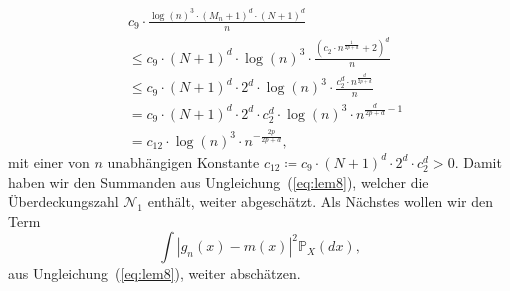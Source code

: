 {\begin{equation}
\begin{split}
& c_9 \cdot \frac{\log(n)^3 \cdot (M_n + 1)^d \cdot (N + 1)^d}{n} \\
& \leq c_9 \cdot (N+1)^d \cdot \log(n)^3 \cdot \frac{(c_2 \cdot n^{\frac{1}{2p + d}} + 2)^d}{n} \\
& \leq c_9 \cdot (N+1)^d \cdot 2^d \cdot \log(n)^3 \cdot \frac{c_2^d\cdot n^{\frac{d}{2p + d}}}{n} \\
& = c_9 \cdot (N+1)^d \cdot 2^d \cdot c_2^d \cdot \log(n)^3 \cdot n^{\frac{d}{2p + d} - 1} \\
& = c_{12} \cdot \log(n)^3 \cdot n^{-\frac{2p}{2p + d}},
\end{split}
\end{equation}
mit einer von $n$ unabhängigen Konstante $c_{12} \coloneqq c_9 \cdot (N + 1)^d \cdot 2^d \cdot c_2^d > 0.$
Damit haben wir den Summanden aus Ungleichung~(\ref{eq:lem8}), welcher die Überdeckungszahl $\mathcal{N}_1$ enthält, weiter abgeschätzt.
Als Nächstes wollen wir den Term
$$
\int |g_{n}(x) - m(x)|^2 \mathds{P}_X(dx),
$$
aus Ungleichung~(\ref{eq:lem8}), weiter abschätzen.

}
